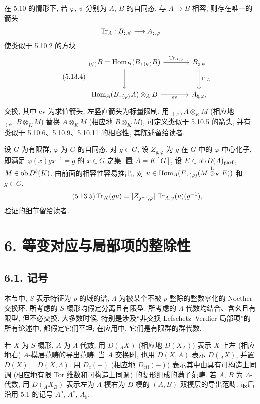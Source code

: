 在 5.10 的情形下, 若 $\varphi$, $\psi$ 分别为 $A$, $B$ 的自同态, 与 $A\to B$ 相容, 则存在唯一的箭头
\[
\operatorname{Tr}_A:B_{\natural,\psi}\longrightarrow A_{\natural,\varphi}
\]
使类似于 5.10.2 的方块
\begin{equation}\tag{5.13.4}
\begin{tikzcd}[column sep=large,row sep=large]
{}_{(\psi)}B=\Hom_B(B,{}_{(\psi)}B) \arrow[r,"\Tr_{B,\psi}"] \arrow[d] & B_{\natural,\psi} \arrow[d,"\Tr_A"]\\
\Hom_A(B,{}_{(\varphi)}A)\otimes_AB \arrow[r,"\mathrm{ev}"'] & A_{\natural,\varphi},
\end{tikzcd}
\end{equation}
交换, 其中 $\mathrm{ev}$ 为求值箭头, 左竖直箭头为标量限制. 用 ${}_{(\varphi)}A\otimes_KM$ (相应地 ${}_{(\psi)}B\otimes_KM$) 替换 $A\otimes_KM$ (相应地 $B\otimes_KM$), 可定义类似于 5.10.5 的箭头, 并有类似于 5.10.6、5.10.9、5.10.11 的相容性, 其陈述留给读者.

设 $G$ 为有限群, $\varphi$ 为 $G$ 的自同态. 对 $g\in G$, 设 $Z_{g,\varphi}$ 为 $g$ 在 $G$ 中的 $\varphi$-中心化子, 即满足 $\varphi(x)gx^{-1}=g$ 的 $x\in G$ 之集. 置 $A=K[G]$, 设 $E\in\operatorname{ob} D(A)_{\mathrm{parf}}$, $M\in\operatorname{ob} D^b(K)$. 由前面的相容性容易推出, 对 $u\in\operatorname{Hom}_A(E,{}_{(\varphi)}(M\overset{\mathrm L}{\otimes}_KE))$ 和 $g\in G$,
\begin{equation}\tag{5.13.5}
\operatorname{Tr}_K(gu)=|Z_{g^{-1},\varphi}|\,\operatorname{Tr}_{A,\varphi}(u)(g^{-1}),
\end{equation}
验证的细节留给读者.

\section*{6. 等变对应与局部项的整除性}

\subsection*{6.1. 记号}

本节中, $S$ 表示特征为 $p$ 的域的谱, $\Lambda$ 为被某个不被 $p$ 整除的整数零化的 Noether 交换环. 所考虑的 $S$-概形均假定分离且有限型. 所考虑的 $\Lambda$-代数均结合、含幺且有限型, 但不必交换. 大多数时候, 特别是涉及``非交换 Lefschetz--Verdier 局部项''的所有论述中, 都假定它们平坦; 在应用中, 它们是有限群的群代数.

若 $X$ 为 $S$-概形, $A$ 为 $\Lambda$-代数, 用 $D({}_AX)$ (相应地 $D(X_A)$) 表示 $X$ 上左 (相应地右) $A$-模层范畴的导出范畴. 当 $A$ 交换时, 也用 $D(X,A)$ 表示 $D({}_AX)$, 并置 $D(X)=D(X,\Lambda)$. 用 $D_c(-)$ (相应地 $D_{\mathrm{ctf}}(-)$) 表示其中由具有可构造上同调 (相应地有限 Tor 维数和可构造上同调) 的复形组成的满子范畴. 若 $A$, $B$ 为 $\Lambda$-代数, 用 $D({}_AX_B)$ 表示左为 $A$-模右为 $B$-模的 $(A,B)$-双模层的导出范畴. 最后沿用 5.1 的记号 $A^o$, $A^e$, $A_{\natural}$.

